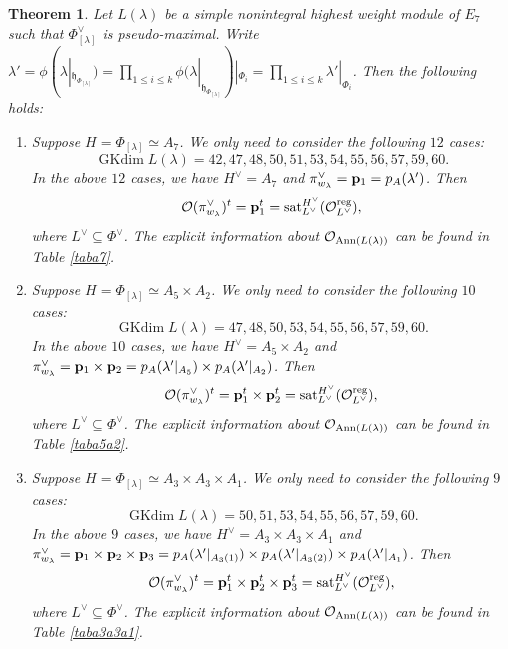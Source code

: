 \documentclass[reqno,12pt]{amsart}
\numberwithin{equation}{section}
\theoremstyle{plain}
\newtheorem{Thm}{Theorem}[section]
\theoremstyle{definition}
\newcommand{\lam}{\lambda}
\renewcommand{\subset}{\subseteq}
\newcommand{\gkd}{\operatorname{GKdim}}
\newcommand{\lest}{\leqslant}
\begin{document}
\begin{Thm}\label{e7-av}
Let $L(\lam)$ be a simple nonintegral highest weight module of $E_7$ such that $\Phi_{[\lam]}^\vee$ is pseudo-maximal. Write $\lam'=\phi(\lam|_{\mathfrak{h}_{\Phi_{[\lambda]}}})=\prod\limits_{1\lest i\lest k} \phi(\lambda|_{\mathfrak{h}_{\Phi_{[\lambda]}}})|_{{\Phi_i}}=\prod\limits_{1\lest i\lest k} \lam'|_{{\Phi_i}}$.
	Then
    the following holds:
    \begin{enumerate}
	

\item Suppose $H=\Phi_{[\lam]}\simeq A_7$. We only need to consider the following $12$ cases:
$$\gkd L(\lam)=42,47,48,50,51,53,54,55,56,57,59,60.$$
In the above $12$ cases, we have $H^{\vee}= A_7$ and   
$\pi^{\vee}_{w_{\lam}}={\bf p}_{1}=p_{A}(\lam')$. Then $$\mathcal{O}(\pi^{\vee}_{w_{\lam}})^t={\bf p}_{1}^t = {\rm sat}_{L^\vee}^{H^\vee} (\mathcal{O}_{L^\vee}^{\rm reg}),$$
where $L^\vee \subset \Phi^\vee$. The explicit information about $\mathcal{O}_{{\rm Ann}(L(\lambda))}$ can be found in Table \ref{taba7}. 

\item Suppose $H=\Phi_{[\lam]}\simeq A_5\times A_2$. We only need to consider the following $10$ cases:
$$\gkd L(\lam)=47,48,50,53,54,55,56,57,59,60.$$
In the above $10$ cases, we have $H^{\vee}=A_5\times A_2$ and   
$\pi^{\vee}_{w_{\lam}}={\bf p}_{1}\times {\bf p}_{2}=p_{A}(\lam'|_{A_5})\times p_{A}(\lam'|_{A_2})$. Then $$\mathcal{O}(\pi^{\vee}_{w_{\lam}})^t={\bf p}_{1}^t \times {\bf p}_{2}^t = {\rm sat}_{L^\vee}^{H^\vee} (\mathcal{O}_{L^\vee}^{\rm reg}),$$
where $L^\vee \subset \Phi^\vee$. The explicit information about $\mathcal{O}_{{\rm Ann}(L(\lambda))}$ can be found in Table \ref{taba5a2}.

\item Suppose $H=\Phi_{[\lam]}\simeq A_3\times A_3\times A_1$. We only need to consider the following $9$ cases:
$$\gkd L(\lam)=50,51,53,54,55,56,57,59,60.$$
In the above $9$ cases, we have $H^{\vee}=A_3\times A_3\times A_1$ and   
$\pi^{\vee}_{w_{\lam}}={\bf p}_{1}\times {\bf p}_{2}\times {\bf p}_{3}=p_{A}(\lam'|_{A_3(1)})\times p_{A}(\lam'|_{A_3(2)})\times p_{A}(\lam'|_{A_1})$. Then $$\mathcal{O}(\pi^{\vee}_{w_{\lam}})^t={\bf p}_{1}^t \times {\bf p}_{2}^t \times {\bf p}_{3}^t = {\rm sat}_{L^\vee}^{H^\vee} (\mathcal{O}_{L^\vee}^{\rm reg}),$$
where $L^\vee \subset \Phi^\vee$. The explicit information about $\mathcal{O}_{{\rm Ann}(L(\lambda))}$ can be found in Table \ref{taba3a3a1}.


\end{enumerate}
\end{Thm}
\end{document}
